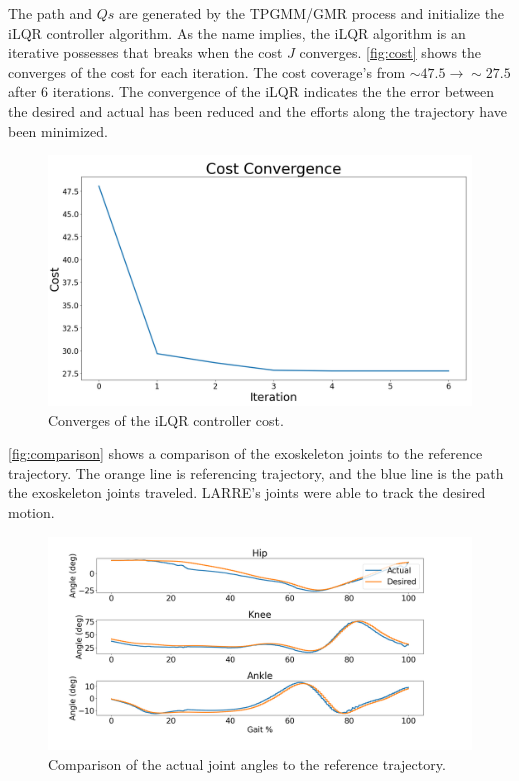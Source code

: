The path and $Qs$ are generated by the TPGMM/GMR process and initialize the iLQR controller algorithm. As the name implies, the iLQR algorithm is an iterative possesses that breaks when the cost $J$ converges.  \autoref{fig:cost} shows the converges of the cost for each iteration. The cost coverage's from $\sim 47.5 \rightarrow \sim 27.5$ after 6 iterations. The convergence of the iLQR indicates the the error between the desired and actual has been reduced and the efforts along the trajectory have been minimized. 

 

\begin{figure}[h!]
    \centering
    \includegraphics[scale=0.22]{images/controllers/Cost_plt3.png}
    \caption[iLQR controller Convergence]{Converges of the iLQR controller cost.}
    \label{fig:cost}
\end{figure}


\autoref{fig:comparison} shows a comparison of the exoskeleton joints to the reference trajectory. The orange line is referencing trajectory, and the blue line is the path the exoskeleton joints traveled. LARRE's joints were able to track the desired motion. 


\begin{figure}[h!]
    \centering
    \includegraphics[scale=0.27]{images/controllers/compare_traj.png}
    \caption[iLQR controller trajectory]{Comparison of the actual joint angles to the reference trajectory.}
    \label{fig:comparison}
\end{figure}


